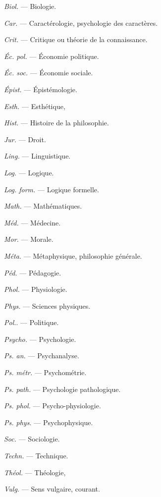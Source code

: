 \vspace{0.211cm}
\hfill
\begin{minipage}[c]{.45\linewidth}
\textsf{\textit {Biol.}} — Biologie.

\textsf{\textit {Car.}} — Caractérologie, psychologie
des caractères.

\textsf{\textit {Crit.}} — Critique ou théorie de la
connaissance.

\textsf{\textit {Éc. pol.}} — Économie politique.

\textsf{\textit {Éc. soc.}} — Économie sociale.

\textsf{\textit {Épist.}} — Épistémologie.

\textsf{\textit {Esth.}} — Esthétique,

\textsf{\textit {Hist.}} — Histoire de la philosophie.

\textsf{\textit {Jur.}} — Droit.

\textsf{\textit {Ling.}} — Linguistique.

\textsf{\textit {Log.}} — Logique.

\textsf{\textit {Log. form.}} — Logique formelle.

\textsf{\textit {Math.}} — Mathématiques.

\textsf{\textit {Méd.}} — Médecine.

\textsf{\textit {Mor.}} — Morale.
\end{minipage}
\hfill
\begin{minipage}[c]{.45\linewidth}
\textsf{\textit {Méta.}} — Métaphysique, philosophie
générale.

\textsf{\textit {Péd.}} — Pédagogie.

\textsf{\textit {Phol.}} — Physiologie.

\textsf{\textit {Phys.}} — Sciences physiques.

\textsf{\textit {Pol.}}. — Politique.

\textsf{\textit {Psycho.}} — Psychologie.

\textsf{\textit {Ps. an.}} — Psychanalyse.

\textsf{\textit {Ps. métr.}} — Psychométrie.

\textsf{\textit {Ps. path.}} — Psychologie pathologique.

\textsf{\textit {Ps. phol.}} — Psycho-physiologie.

\textsf{\textit {Ps. phys.}} — Psychophysique.

\textsf{\textit {Soc.}} — Sociologie.

\textsf{\textit {Techn.}} — Technique.

\textsf{\textit {Théol.}} — Théologie,

\textsf{\textit {Vulg.}} — Sens vulgaire, courant.
\end{minipage}

